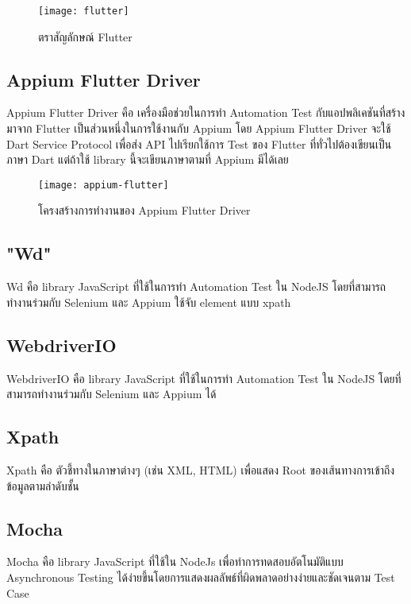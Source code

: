         \begin{figure}[H]
            \centering
            \texttt{[image: flutter]}
            \caption{ตราสัญลักษณ์ Flutter}\label{flutter}
        \end{figure}

    \subsection{Appium Flutter Driver}
        Appium Flutter Driver คือ เครื่องมือช่วยในการทำ Automation Test กับแอปพลิเคชันที่สร้างมาจาก Flutter เป็นส่วนหนึ่งในการใช้งานกับ Appium โดย Appium Flutter Driver จะใช้ Dart Service Protocol เพื่อส่ง API ไปเรียกใช้การ Test ของ Flutter ที่ทั่วไปต้องเขียนเป็นภาษา Dart แต่ถ้าใช้ library นี้จะเขียนภาษาตามที่ Appium มีได้เลย

        \begin{figure}[H]
            \centering
            \texttt{[image: appium-flutter]}
            \caption{โครงสร้างการทำงานของ Appium Flutter Driver}\label{appium-flutter}
        \end{figure}

    \subsection{"Wd"}
        Wd คือ library JavaScript ที่ใช้ในการทำ Automation Test ใน NodeJS โดยที่สามารถทำงานร่วมกับ Selenium และ Appium ใช้จับ element แบบ xpath

    \subsection{WebdriverIO}
        WebdriverIO คือ library JavaScript ที่ใช้ในการทำ Automation Test ใน NodeJS โดยที่สามารถทำงานร่วมกับ Selenium และ Appium ได้

    \subsection{Xpath}
        Xpath คือ ตัวชี้ทางในภาษาต่างๆ (เช่น XML, HTML) เพื่อแสดง Root ของเส้นทางการเข้าถึงข้อมูลตามลำดับชั้น
        
    \subsection{Mocha}
        Mocha คือ library JavaScript ที่ใช้ใน NodeJs เพื่อทำการทดสอบอัตโนมัติแบบ Asynchronous Testing ได้ง่ายขึ้นโดยการแสดงผลลัพธ์ที่ผิดพลาดอย่างง่ายและชัดเจนตาม Test Case

